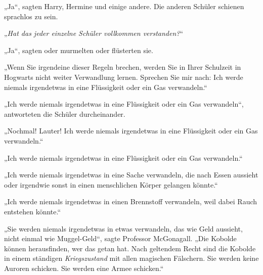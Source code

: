 „Ja“, sagten Harry, Hermine und einige andere. Die anderen Schüler schienen sprachlos zu sein.

„\emph{Hat das jeder einzelne Schüler vollkommen verstanden?}“

„Ja“, sagten oder murmelten oder flüsterten sie.

„Wenn Sie irgendeine dieser Regeln brechen, werden Sie in Ihrer Schulzeit in Hogwarts nicht weiter Verwandlung lernen. Sprechen Sie mir nach: Ich werde niemals irgendetwas in eine Flüssigkeit oder ein Gas verwandeln.“

„Ich werde niemals irgendetwas in eine Flüssigkeit oder ein Gas verwandeln“, antworteten die Schüler durcheinander.

„Nochmal! Lauter! Ich werde niemals irgendetwas in eine Flüssigkeit oder ein Gas verwandeln.“

„Ich werde niemals irgendetwas in eine Flüssigkeit oder ein Gas verwandeln.“

„Ich werde niemals irgendetwas in eine Sache verwandeln, die nach Essen aussieht oder irgendwie sonst in einen menschlichen Körper gelangen könnte.“

„Ich werde niemals irgendetwas in einen Brennstoff verwandeln, weil dabei Rauch entstehen könnte.“

„Sie werden niemals irgendetwas in etwas verwandeln, das wie Geld aussieht, nicht einmal wie Muggel-Geld“, sagte Professor McGonagall.
„Die Kobolde können herausfinden, wer das getan hat. Nach geltendem Recht sind die Kobolde in einem ständigen \emph{Kriegszustand} mit allen magischen Fälschern. Sie werden keine Auroren schicken. Sie werden eine Armee schicken.“


